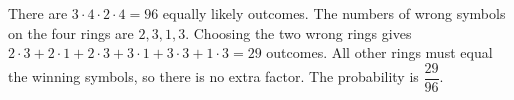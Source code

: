 There are $3\cdot4\cdot2\cdot4=96$ equally likely outcomes. The numbers of wrong symbols on the four rings are $2,3,1,3$. Choosing the two wrong rings gives $2\cdot3+2\cdot1+2\cdot3+3\cdot1+3\cdot3+1\cdot3=29$ outcomes. All other rings must equal the winning symbols, so there is no extra factor. The probability is $\boxed{\dfrac{29}{96}}$.
